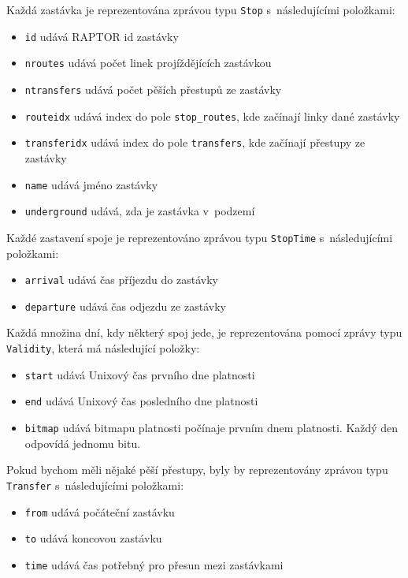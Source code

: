 Každá zastávka je reprezentována zprávou typu {\tt Stop} s~následujícími
položkami:
\begin{itemize}
	\item {\tt id} udává RAPTOR id zastávky
	\item {\tt nroutes} udává počet linek projíždějících zastávkou
	\item {\tt ntransfers} udává počet pěších přestupů ze zastávky
	\item {\tt routeidx} udává index do pole {\tt stop\_routes}, kde
	začínají linky dané zastávky
	\item {\tt transferidx} udává index do pole {\tt transfers}, kde
	začínají přestupy ze zastávky
	\item {\tt name} udává jméno zastávky
	\item {\tt underground} udává, zda je zastávka v~podzemí
\end{itemize}
Každé zastavení spoje je reprezentováno zprávou typu {\tt StopTime}
s~následujícími položkami:
\begin{itemize}
	\item {\tt arrival} udává čas příjezdu do zastávky
	\item {\tt departure} udává čas odjezdu ze zastávky
\end{itemize}
Každá množina dní, kdy některý spoj jede, je reprezentována pomocí zprávy typu
{\tt Validity}, která má následující položky:
\begin{itemize}
	\item {\tt start} udává Unixový čas prvního dne platnosti 
	\item {\tt end} udává Unixový čas posledního dne platnosti
	\item {\tt bitmap} udává bitmapu platnosti počínaje prvním dnem
	platnosti. Každý den odpovídá jednomu bitu.
\end{itemize}
Pokud bychom měli nějaké pěší přestupy, byly by reprezentovány zprávou typu {\tt
Transfer} s~následujícími položkami:
\begin{itemize}
	\item {\tt from} udává počáteční zastávku
	\item {\tt to} udává koncovou zastávku
	\item {\tt time} udává čas potřebný pro přesun mezi zastávkami
\end{itemize}
